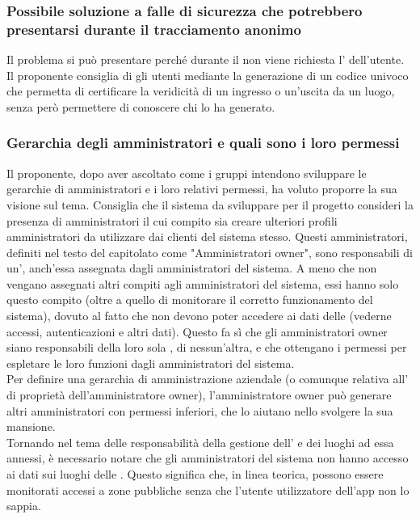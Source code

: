 \subsubsection*{Possibile soluzione a falle di sicurezza che potrebbero presentarsi durante il tracciamento anonimo}
Il problema si può presentare perché durante il  non viene richiesta l' dell'utente.
Il proponente consiglia di  gli utenti mediante la generazione di un codice univoco che permetta di certificare la veridicità di un ingresso o un'uscita da un luogo, senza però permettere di conoscere chi lo ha generato.

\subsubsection*{Gerarchia degli amministratori e quali sono i loro permessi}
Il proponente, dopo aver ascoltato come i gruppi intendono sviluppare le gerarchie di amministratori e i loro relativi permessi, ha voluto proporre la sua visione sul tema.
Consiglia che il sistema da sviluppare per il progetto consideri la presenza di amministratori il cui compito sia creare ulteriori profili amministratori da utilizzare
dai clienti del sistema stesso. Questi amministratori, definiti nel testo del capitolato come "Amministratori owner", sono responsabili di un', anch'essa assegnata dagli amministratori del sistema.
A meno che non vengano assegnati altri compiti agli amministratori del sistema, essi hanno solo questo compito (oltre a quello di monitorare il corretto funzionamento del sistema), dovuto al fatto che non devono poter accedere ai dati delle  (vederne accessi, autenticazioni e altri dati).
Questo fa sì che gli amministratori owner siano responsabili della loro sola , di nessun'altra, e che ottengano i permessi per espletare le loro funzioni dagli amministratori del sistema.\\
Per definire una gerarchia di amministrazione aziendale (o comunque relativa all' di proprietà dell'amministratore owner), l'amministratore owner può generare altri amministratori con permessi inferiori, che lo aiutano nello svolgere la sua mansione.\\
Tornando nel tema delle responsabilità della gestione dell' e dei luoghi ad essa annessi, è necessario notare che gli amministratori del sistema non hanno accesso ai dati sui luoghi delle .
Questo significa che, in linea teorica, possono essere monitorati accessi a zone pubbliche senza che l'utente utilizzatore dell'app non lo sappia.
